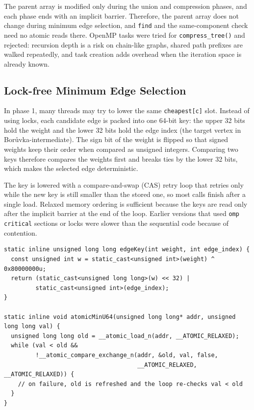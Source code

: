 \documentclass[11pt,a4paper]{article}
\begin{document}
The parent array is modified only during the union and compression phases, and each phase ends with an implicit barrier. Therefore, the parent array does not change during minimum edge selection, and \texttt{find} and the same-component check need no atomic reads there. OpenMP tasks were tried for \texttt{compress\_tree()} and rejected: recursion depth is a risk on chain-like graphs, shared path prefixes are walked repeatedly, and task creation adds overhead when the iteration space is already known.

\subsection*{Lock-free Minimum Edge Selection}
In phase 1, many threads may try to lower the same \texttt{cheapest[c]} slot. Instead of using locks, each candidate edge is packed into one 64-bit key: the upper 32 bits hold the weight and the lower 32 bits hold the edge index (the target vertex in Bor\r{u}vka-intermediate). The sign bit of the weight is flipped so that signed weights keep their order when compared as unsigned integers. Comparing two keys therefore compares the weights first and breaks ties by the lower 32 bits, which makes the selected edge deterministic.

The key is lowered with a compare-and-swap (CAS) retry loop that retries only while the new key is still smaller than the stored one, so most calls finish after a single load. Relaxed memory ordering is sufficient because the keys are read only after the implicit barrier at the end of the loop. Earlier versions that used \texttt{omp critical} sections or locks were slower than the sequential code because of contention.

\begin{lstlisting}
static inline unsigned long long edgeKey(int weight, int edge_index) {
  const unsigned int w = static_cast<unsigned int>(weight) ^ 0x80000000u;
  return (static_cast<unsigned long long>(w) << 32) |
         static_cast<unsigned int>(edge_index);
}

static inline void atomicMinU64(unsigned long long* addr, unsigned long long val) {
  unsigned long long old = __atomic_load_n(addr, __ATOMIC_RELAXED);
  while (val < old &&
         !__atomic_compare_exchange_n(addr, &old, val, false,
                                      __ATOMIC_RELAXED, __ATOMIC_RELAXED)) {
    // on failure, old is refreshed and the loop re-checks val < old
  }
}
\end{lstlisting}
\end{document}
